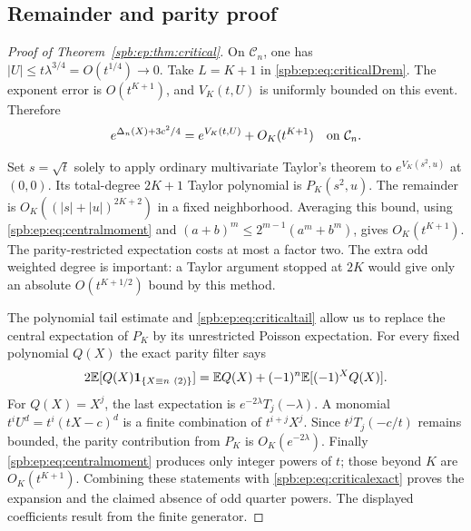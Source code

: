 \subsection{Remainder and parity proof}
\begin{proof}[Proof of Theorem~\ref{spb:ep:thm:critical}]
On $\mathcal C_n$, one has
$|U|\le t\lambda^{3/4}=O(t^{1/4})\to0$.
Take $L=K+1$ in \eqref{spb:ep:eq:criticalDrem}. The exponent error is
$O(t^{K+1})$, and $V_K(t,U)$ is uniformly bounded on this event.
Therefore
\begin{equation}\label{spb:ep:eq:criticalexprem}
 e^{\Delta_n(X)+3c^2/4}
       =e^{V_K(t,U)}+O_K(t^{K+1})
       \quad\hbox{on }\mathcal C_n.
\end{equation}

Set $s=\sqrt t$ solely to apply ordinary multivariate Taylor's theorem to
$e^{V_K(s^2,u)}$ at $(0,0)$. Its total-degree $2K+1$ Taylor polynomial is
$P_K(s^2,u)$. The remainder is
$O_K((|s|+|u|)^{2K+2})$ in a fixed neighborhood.
Averaging this bound, using \eqref{spb:ep:eq:centralmoment} and
$(a+b)^m\le2^{m-1}(a^m+b^m)$, gives $O_K(t^{K+1})$.
The parity-restricted expectation costs at most a factor two.
The extra odd weighted degree is important: a Taylor argument stopped at
$2K$ would give only an absolute $O(t^{K+1/2})$ bound by this method.

The polynomial tail estimate and \eqref{spb:ep:eq:criticaltail} allow us to replace
the central expectation of $P_K$ by its unrestricted Poisson expectation.
For every fixed polynomial $Q(X)$ the exact parity filter says
\[
 2\mathbb E[Q(X)\mathbf 1_{\{X\equiv n\ (2)\}}]
    =\mathbb E Q(X)+(-1)^n\mathbb E[(-1)^XQ(X)].
\]
For $Q(X)=X^j$, the last expectation is
$e^{-2\lambda}T_j(-\lambda)$.
A monomial $t^iU^d=t^i(tX-c)^d$ is a finite combination of
$t^{i+j}X^j$. Since $t^jT_j(-c/t)$ remains bounded, the parity contribution
from $P_K$ is $O_K(e^{-2\lambda})$.
Finally \eqref{spb:ep:eq:centralmoment} produces only integer powers of $t$;
those beyond $K$ are $O_K(t^{K+1})$.
Combining these statements with \eqref{spb:ep:eq:criticalexact} proves the
expansion and the claimed absence of odd quarter powers.
The displayed coefficients result from the finite generator.
\end{proof}

